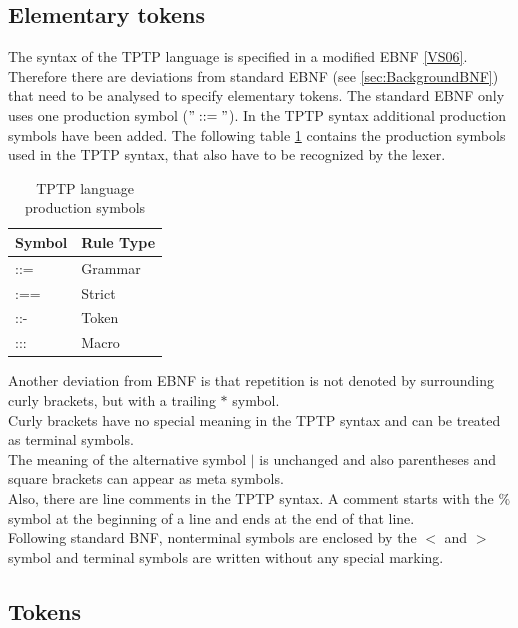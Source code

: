 \subsection{Elementary tokens}\label{sec:ConceptElementaryTokens}
The syntax of the \ac{TPTP} language is specified in a modified \ac{EBNF} \ref{VS06}.
Therefore there are deviations from standard \ac{EBNF} (see \ref{sec:BackgroundBNF}) that need to be analysed to specify elementary tokens.
The standard \ac{EBNF} only uses one production symbol ($"::="$).
In the \ac{TPTP} syntax additional production symbols have been added.
The following table \ref{tbl:ConceptTPTPProductionSymbols} contains the production symbols used in the \ac{TPTP} syntax, that also have to be recognized by the lexer.
\begin{table}[H]
\centering
\renewcommand{\arraystretch}{1}
\caption{\ac{TPTP} language production symbols \cite{VS06}}
\begin{tabular}{ll}
\textbf{Symbol} & \textbf{Rule Type}\\\hline
::= & Grammar\\
:== & Strict\\
::- & Token\\
::: & Macro\\
\end{tabular}
\label{tbl:ConceptTPTPProductionSymbols}
\end{table}

Another deviation from \ac{EBNF} is that repetition is not denoted by surrounding curly brackets, but with a trailing $*$ symbol.\\
Curly brackets have no special meaning in the \ac{TPTP} syntax and can be treated as terminal symbols.\\
The meaning of the alternative symbol $|$ is unchanged and also parentheses and square brackets can appear as meta symbols.\\
Also, there are line comments in the \ac{TPTP} syntax.
A comment starts with the $\%$ symbol at the beginning of a line and ends at the end of that line.\\
Following standard \ac {BNF}, nonterminal symbols are enclosed by the $<$ and $>$ symbol and terminal symbols are written without any special marking.

 

\subsection{Tokens}\label{sec:ConceptTokens}

